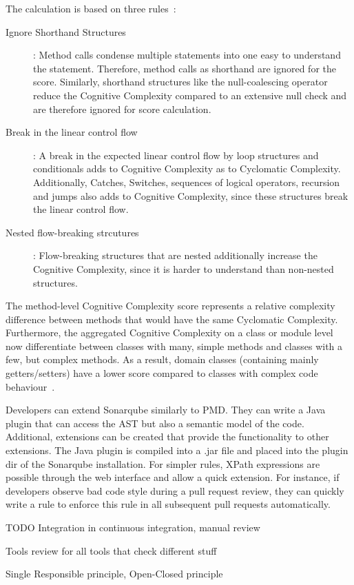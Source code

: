 The calculation is based on three rules~\cite{campbell2018cognitive}:
\begin{description}
    \item[Ignore Shorthand Structures]: Method calls condense multiple statements into one easy to understand the statement. Therefore, method calls as shorthand are ignored for the score. Similarly, shorthand structures like the null-coalescing operator reduce the Cognitive Complexity compared to an extensive null check and are therefore ignored for score calculation.
    \item[Break in the linear control flow]: A break in the expected linear control flow by loop structures and conditionals adds to Cognitive Complexity as to Cyclomatic Complexity. Additionally, Catches, Switches, sequences of logical operators, recursion and jumps also adds to Cognitive Complexity, since these structures break the linear control flow.
    \item[Nested flow-breaking strcutures]: Flow-breaking structures that are nested additionally increase the Cognitive Complexity, since it is harder to understand than non-nested structures.  
\end{description}
The method-level Cognitive Complexity score represents a relative complexity difference between methods that would have the same Cyclomatic Complexity. Furthermore, the aggregated Cognitive Complexity on a class or module level now differentiate between classes with many, simple methods and classes with a few, but complex methods. As a result, domain classes (containing mainly getters/setters) have a lower score compared to classes with complex code behaviour~\cite{campbell2018cognitive}.

Developers can extend Sonarqube similarly to PMD. They can write a Java plugin that can access the AST but also a semantic model of the code. Additional, extensions can be created that provide the functionality to other extensions. The Java plugin is compiled into a .jar file and placed into the plugin dir of the Sonarqube installation. For simpler rules, XPath expressions are possible through the web interface and allow a quick extension. For instance, if developers observe bad code style during a pull request review, they can quickly write a rule to enforce this rule in all subsequent pull requests automatically.

TODO
Integration in continuous integration, manual review

Tools review for all tools that check different stuff

Single Responsible principle, Open-Closed principle

